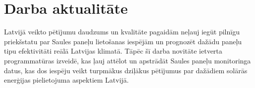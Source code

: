\section{Darba aktualitāte}

Latvijā veikto pētījumu daudzums un kvalitāte pagaidām neļauj iegūt pilnīgu priekšstatu par Saules paneļu lietošanas iespējām un prognozēt dažādu paneļu tipu efektivitāti reālā Latvijas klimatā. Tāpēc šī darba novitāte ietverta programmatūras izveidē, kas ļauj attēlot un apstrādāt Saules paneļu monitoringa datus, kas dos iespēju veikt turpmākus dziļākus pētījumus par dažādiem solārās enerģijas pielietojuma aspektiem Latvijā.

